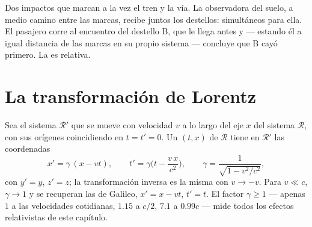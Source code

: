 \begin{omfigure}

{\small Dos impactos que marcan a la vez el tren y la vía. La observadora
del suelo, a medio camino entre las marcas, recibe juntos los destellos:
simultáneos para ella. El pasajero corre al encuentro del destello B, que le
llega antes y --- estando él a igual distancia de las marcas en su propio
sistema --- concluye que B cayó primero. La  es relativa.}
\end{omfigure}

\section{La transformación de Lorentz}

\begin{theorem}\label{thm:b3:relativistic-kinematics:lorentz}
Sea el sistema $\mathcal R'$ que se mueve con velocidad $v$ a lo largo del
eje $x$ del sistema $\mathcal R$, con sus orígenes coincidiendo en
$t = t' = 0$. Un  $(t, x)$ de $\mathcal R$ tiene en $\mathcal R'$ las
coordenadas
\[
x' = \gamma\,(x - vt) , \qquad
t' = \gamma\Big(t - \frac{v\,x}{c^2}\Big) , \qquad
\gamma = \frac{1}{\sqrt{1 - v^2/c^2}} ,
\]
con $y' = y$, $z' = z$; la transformación inversa es la misma con
$v \to -v$. Para $v \ll c$, $\gamma \to 1$ y se recuperan las de Galileo,
$x' = x - vt$, $t' = t$. El factor $\gamma \ge 1$ --- apenas $1$ a las
velocidades cotidianas, $1.15$ a $c/2$, $7.1$ a $0.99c$ --- mide todos los
efectos relativistas de este capítulo.
\end{theorem}

